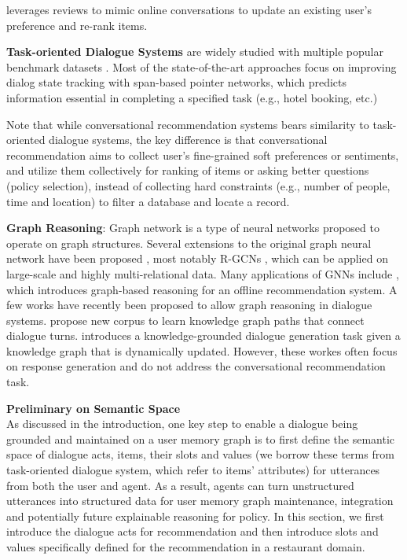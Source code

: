 \cite{zhang2018towards} leverages reviews to mimic online conversations to update an existing user's preference and re-rank items.

\noindent \textbf{Task-oriented Dialogue Systems} are widely studied with multiple popular benchmark datasets \cite{dstc2, woz, multiwoz, multiwoz2.1,sgd-dst}.
Most of the state-of-the-art approaches \cite{trade,bert-dst-alexa,bert-dst-cmu} focus on improving dialog state tracking with span-based pointer networks, which predicts information essential in completing a specified task (e.g., hotel booking, etc.)

Note that while conversational recommendation systems bears similarity to task-oriented dialogue systems, the key difference is that conversational recommendation aims to collect user's fine-grained soft preferences or sentiments, and utilize them collectively for ranking of items or asking better questions (policy selection), instead of collecting hard constraints (e.g., number of people, time and location) to filter a database and locate a record. 

\noindent \textbf{Graph Reasoning}:
Graph network \cite{scarselli2008graph,duvenaud2015convolutional,defferrard2016convolutional,kipf2016semi} is a type of neural networks proposed to operate on graph structures. 
Several extensions to the original graph neural network have been proposed \cite{li2015gated,pham2017column},
most notably R-GCNs \cite{schlichtkrull2018modeling}, which can be applied on large-scale and highly multi-relational data.
Many applications of GNNs include \cite{Xian2019ReinforcementKG}, which introduces graph-based reasoning for an offline recommendation system.
A few works have recently been proposed to allow graph reasoning in dialogue systems.
\cite{Moon+19a, Moon+19b} propose new corpus to learn knowledge graph paths that connect dialogue turns.
\cite{tuan-etal-2019-dykgchat} introduces a knowledge-grounded dialogue generation task given a knowledge graph that is dynamically updated.
However, these workes often focus on response generation and do not address the conversational recommendation task.


\textbf{Preliminary on Semantic Space}\\
\label{chap6:sec:form}
As discussed in the introduction, one key step to enable a dialogue being grounded and maintained on a user memory graph is to first define the semantic space of dialogue acts, items, their slots and values (we borrow these terms from task-oriented dialogue system, which refer to items' attributes) for utterances from both the user and agent.
As a result, agents can turn unstructured utterances into structured data for user memory graph maintenance, integration and potentially future explainable reasoning for policy.
In this section, we first introduce the dialogue acts for recommendation and then introduce slots and values specifically defined for the recommendation in a restaurant domain.

